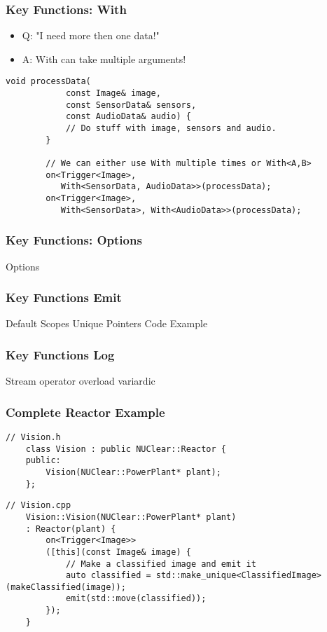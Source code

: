 \documentclass{beamer}
\begin{document}
\begin{frame}[fragile]
	\frametitle {Key Functions: With}
	\begin{itemize}
		\item Q: "I need more then one data!"
		\item A: With can take multiple arguments!
	\end{itemize}

	\begin{lstlisting}[language=nuclear]
		void processData(
		    const Image& image,
		    const SensorData& sensors,
		    const AudioData& audio) {
		    // Do stuff with image, sensors and audio.
		}

		// We can either use With multiple times or With<A,B>
		on<Trigger<Image>, 
		   With<SensorData, AudioData>>(processData);
		on<Trigger<Image>, 
		   With<SensorData>, With<AudioData>>(processData);
	\end{lstlisting}
\end{frame}

\begin{frame}
	\frametitle {Key Functions: Options}
\end{frame}

\begin{frame}
	Options
\end{frame}

\begin{frame}
	\frametitle{Key Functions Emit}
	Default
	Scopes
	Unique Pointers
	Code Example
\end{frame}

\begin{frame}
	\frametitle{Key Functions Log}
	Stream operator overload
	variardic
\end{frame}

\begin{frame}[fragile]
	\frametitle{Complete Reactor Example}
		
	\begin{lstlisting}[language=nuclear]
	// Vision.h
	class Vision : public NUClear::Reactor {
	public:
	    Vision(NUClear::PowerPlant* plant);
	};
	\end{lstlisting}
	
	\begin{lstlisting}[language=nuclear]
	// Vision.cpp
	Vision::Vision(NUClear::PowerPlant* plant)
	: Reactor(plant) {        
	    on<Trigger<Image>>
	    ([this](const Image& image) {
	        // Make a classified image and emit it
	        auto classified = std::make_unique<ClassifiedImage>(makeClassified(image));
	        emit(std::move(classified));
	    });
	}
	\end{lstlisting}
\end{frame}
\end{document}
